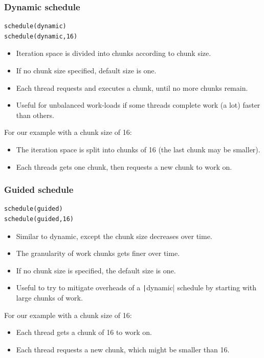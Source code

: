 \documentclass[aspectratio=169]{beamer}
\begin{document}
\begin{frame}[fragile]
\frametitle{Dynamic schedule}
\begin{verbatim}
schedule(dynamic)
schedule(dynamic,16)
\end{verbatim}

\begin{itemize}
  \item Iteration space is divided into chunks according to chunk size.
  \item If no chunk size specified, default size is one.
  \item Each thread requests and executes a chunk, until no more chunks remain.
  \item Useful for unbalanced work-loads if some threads complete work (a lot) faster than others.
\end{itemize}

For our example with a chunk size of 16:
\begin{itemize}
  \item The iteration space is split into chunks of 16 (the last chunk may be smaller).
  \item Each threads gets one chunk, then requests a new chunk to work on.
\end{itemize}

\end{frame}

\begin{frame}[fragile]
\frametitle{Guided schedule}
\begin{verbatim}
schedule(guided)
schedule(guided,16)
\end{verbatim}

\begin{itemize}
  \item Similar to dynamic, except the chunk size decreases over time.
  \item The granularity of work chunks gets finer over time.
  \item If no chunk size is specified, the default size is one.
  \item Useful to try to mitigate overheads of a \texttt|dynamic| schedule by starting with large chunks of work.
\end{itemize}

For our example with a chunk size of 16:
\begin{itemize}
  \item Each thread gets a chunk of 16 to work on.
  \item Each thread requests a new chunk, which might be smaller than 16.
\end{itemize}

\end{frame}
\end{document}
